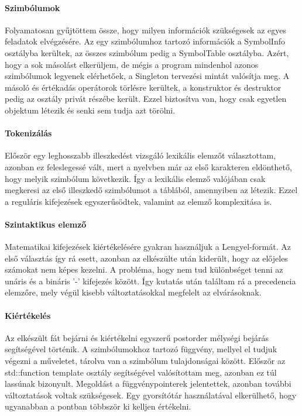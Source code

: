 \documentclass[12pt]{report}
\begin{document}
\paragraph{Szimbólumok}
Folyamatosan gyűjtöttem össze, hogy milyen információk szükségesek az egyes feladatok elvégzésére. Az egy szimbólumhoz tartozó információk a SymbolInfo osztályba kerültek, az összes szimbólum pedig a SymbolTable osztályba. Azért, hogy a sok másolást elkerüljem, de mégis a program mindenhol azonos szimbólumok legyenek elérhetőek, a Singleton tervezési mintát valósítja meg. A másoló és értékadás operátorok törlésre kerültek, a konstruktor és destruktor pedig az osztály privát részébe került. Ezzel biztosítva van, hogy csak egyetlen objektum létezik és senki sem tudja azt törölni.

\paragraph{Tokenizálás}
Először egy leghosszabb illeszkedést vizsgáló lexikális elemzőt választottam, azonban ez feleslegessé vált, mert a nyelvben már az első karakteren eldönthető, hogy melyik szimbólum következik. Így a lexikális elemző valójában csak megkeresi az első illeszkedő szimbólumot a táblából, amennyiben az létezik. Ezzel a reguláris kifejezések egyszerűsödtek, valamint az elemző komplexitása is.

\paragraph{Szintaktikus elemző}
Matematikai kifejezések kiértékelésére gyakran használjuk a Lengyel-formát. Az első választás így rá esett, azonban az elkészülte után kiderült, hogy az előjeles számokat nem képes kezelni. A probléma, hogy nem tud különbséget tenni az unáris és a bináris '-' kifejezés között. Így kutatás után találtam rá a precedencia elemzőre, mely végül kisebb változtatásokkal megfelelt az elvárásoknak. 

\paragraph{Kiértékelés}
Az elkészült fát bejárni és kiértékelni egyszerű postorder mélységi bejárás segítségével történik. A szimbólumokhoz tartozó függvény, mellyel el tudjuk végezni a műveletet, tárolva van a szimbólum tulajdonságai között. Először az std::function template osztály segítségével valósítottam meg, azonban ez túl lassúnak bizonyult. Megoldást a függvénypointerek jelentettek, azonban további változtatások voltak szükségesek. Egy gyorsítótár használatával elkerülhető, hogy ugyanabban a pontban többször ki kelljen értékelni.
\end{document}
